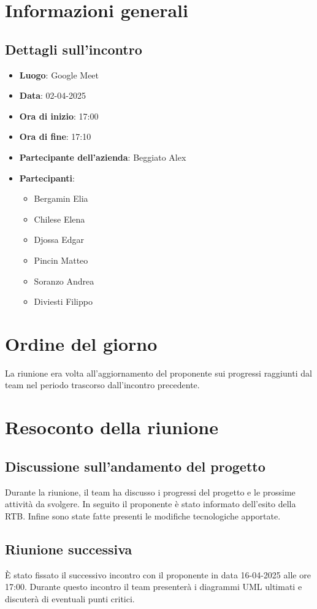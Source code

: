 \section{Informazioni generali}
\subsection{Dettagli sull'incontro}
\begin{itemize}
    \item \textbf{Luogo}: Google Meet
    \item \textbf{Data}: 02-04-2025
    \item \textbf{Ora di inizio}: 17:00
    \item \textbf{Ora di fine}: 17:10
    \item \textbf{Partecipante dell'azienda}: Beggiato Alex
    \item \textbf{Partecipanti}:
    \begin{itemize}
        \item Bergamin Elia
        \item Chilese Elena
        \item Djossa Edgar
        \item Pincin Matteo 
        \item Soranzo Andrea
        \item Diviesti Filippo  
    \end{itemize}
\end{itemize}

\section{Ordine del giorno}
La riunione era volta all'aggiornamento del proponente sui progressi raggiunti dal team nel periodo trascorso dall'incontro precedente.

\section{Resoconto della riunione}
\subsection{Discussione sull'andamento del progetto}
Durante la riunione, il team ha discusso i progressi del progetto e le prossime attività da svolgere. In seguito il proponente è stato informato dell'esito della RTB. Infine sono state fatte presenti le
modifiche tecnologiche apportate.

\subsection{Riunione successiva}
È stato fissato il successivo incontro con il proponente in data 16-04-2025 alle ore 17:00.
Durante questo incontro il team presenterà i diagrammi UML ultimati e discuterà di eventuali punti critici.

